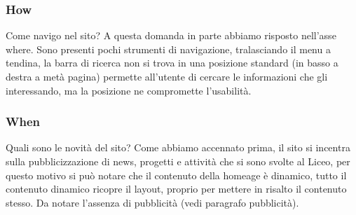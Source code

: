 \documentclass[12pt]{article}
\begin{document}
\subsubsection{How} Come navigo nel sito?
A questa domanda in parte abbiamo risposto nell'asse where.
Sono presenti pochi strumenti di navigazione, tralasciando il menu a tendina, la barra di ricerca non si trova in una posizione standard (in basso a destra a met\`a pagina) permette all'utente di cercare le informazioni che gli interessando, ma la posizione ne compromette l'usabilit\`a.

\subsubsection{When} Quali sono le novit\`a del sito?
Come abbiamo accennato prima, il sito si incentra sulla pubblicizzazione di news, progetti e attivit\`a che si sono svolte al Liceo, per questo motivo si pu\`o notare che il contenuto della homeage \`e dinamico, tutto il contenuto dinamico ricopre il layout, proprio per mettere in risalto il contenuto stesso. Da notare l'assenza di pubblicit\`a (vedi paragrafo pubblicit\`a).
\end{document}
